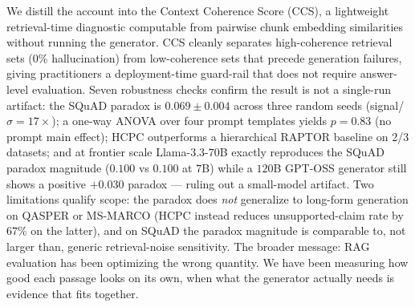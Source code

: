 We distill the account into the Context Coherence Score (CCS), a
lightweight retrieval-time diagnostic computable from pairwise chunk
embedding similarities without running the generator. CCS cleanly
separates high-coherence retrieval sets (0\% hallucination) from
low-coherence sets that precede generation failures, giving practitioners
a deployment-time guard-rail that does not require answer-level
evaluation. Seven robustness checks confirm the result is not a single-run
artifact: the SQuAD paradox is $0.069 \pm 0.004$ across three random
seeds (signal/$\sigma = 17\times$); a one-way ANOVA over four prompt
templates yields $p = 0.83$ (no prompt main effect); HCPC
outperforms a hierarchical RAPTOR baseline on 2/3 datasets; and at
frontier scale Llama-$3.3$-$70$B exactly reproduces the SQuAD paradox
magnitude ($0.100$ vs $0.100$ at $7$B) while a $120$B GPT-OSS
generator still shows a positive $+0.030$ paradox — ruling out a
small-model artifact. Two
limitations qualify scope: the paradox does \emph{not} generalize to
long-form generation on QASPER or MS-MARCO (HCPC instead reduces
unsupported-claim rate by $67\%$ on the latter), and on SQuAD the
paradox magnitude is comparable to, not larger than, generic
retrieval-noise sensitivity. The broader message: RAG evaluation has
been optimizing the wrong quantity. We have been measuring how good
each passage looks on its own, when what the generator actually needs
is evidence that fits together.

